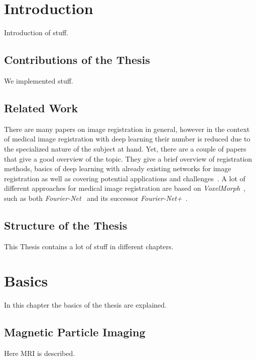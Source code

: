 \documentclass[english,version-2022-01]{uzl-thesis} %
\begin{document}

\chapter{Introduction}
Introduction of stuff.

\section{Contributions of the Thesis}
We implemented stuff.

\section{Related Work}
There are many papers on image registration in general, however in the context of medical image registration with deep learning their number is reduced due to the specialized nature of the subject at hand. Yet, there are a couple of papers that give a good overview of the topic.
They give a brief overview of registration methods, basics of deep learning with already existing networks for image registration as well as covering potential applications and challenges~\cite{Chen2020,Haskins2020,Fu2020,Zou2022,Chen2023}.
A lot of different approaches for medical image registration are based on \emph{VoxelMorph}~\cite{Voxelmorph}, such as both \emph{Fourier-Net}~\cite{Fourier-Net} and its successor \emph{Fourier-Net+}~\cite{Fourier-Net+}.


\section{Structure of the Thesis}
This Thesis contains a lot of stuff in different chapters.


\chapter{Basics}
In this chapter the basics of the thesis are explained.

\section{Magnetic Particle Imaging}
Here MRI is described. %
\end{document}
